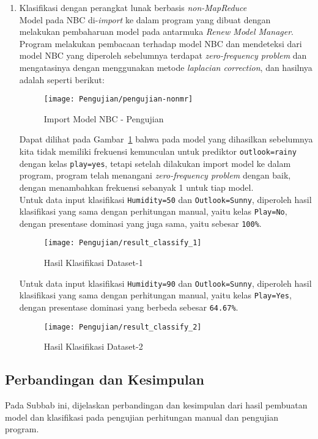 \begin{enumerate}
	\item{Klasifikasi dengan perangkat lunak berbasis \textit{non-MapReduce}}\\
	Model pada NBC di-\textit{import} ke dalam program yang dibuat dengan melakukan pembaharuan model pada antarmuka \textit{Renew Model Manager}. Program melakukan pembacaan terhadap model NBC dan mendeteksi dari model NBC yang diperoleh sebelumnya terdapat \textit{zero-frequency problem} dan mengatasinya dengan menggunakan metode \textit{laplacian correction}, dan hasilnya adalah seperti berikut:
	\begin{figure}[H]
	\centering
	\texttt{[image: Pengujian/pengujian-nonmr]}
	\caption[Import Model NBC - Pengujian]{Import Model NBC - Pengujian}
	\label{fig:Import Model NBC - Pengujian}
	\end{figure}
Dapat dilihat pada Gambar~\ref{fig:Import Model NBC - Pengujian} bahwa pada model yang dihasilkan sebelumnya kita tidak memiliki frekuensi kemunculan untuk prediktor \texttt{outlook=rainy} dengan kelas \texttt{play=yes}, tetapi setelah dilakukan import model ke dalam program, program telah menangani \textit{zero-frequency problem} dengan baik, dengan menambahkan frekuensi sebanyak 1 untuk tiap model.\\

Untuk data input klasifikasi \texttt{Humidity=50} dan \texttt{Outlook=Sunny}, diperoleh hasil klasifikasi yang sama dengan perhitungan manual, yaitu kelas \texttt{Play=No}, dengan presentase dominasi yang juga sama, yaitu sebesar \texttt{100\%}.
\begin{figure}[H]
	\centering
	\texttt{[image: Pengujian/result\_classify\_1]}
	\caption[Hasil Klasifikasi Dataset-1]{Hasil Klasifikasi Dataset-1}
	\label{fig:Hasil Klasifikasi Dataset-1}
\end{figure}

Untuk data input klasifikasi \texttt{Humidity=90} dan \texttt{Outlook=Sunny}, diperoleh hasil klasifikasi yang sama dengan perhitungan manual, yaitu kelas \texttt{Play=Yes}, dengan presentase dominasi yang berbeda sebesar \texttt{64.67\%}.
\begin{figure}[H]
	\centering
	\texttt{[image: Pengujian/result\_classify\_2]}
	\caption[Hasil Klasifikasi Dataset-1]{Hasil Klasifikasi Dataset-2}
	\label{fig:Hasil Klasifikasi Dataset-2}
\end{figure}
	
\end{enumerate}

\subsection{Perbandingan dan Kesimpulan}
Pada Subbab ini, dijelaskan perbandingan dan kesimpulan dari hasil pembuatan model dan klasifikasi pada pengujian perhitungan manual dan pengujian program.

